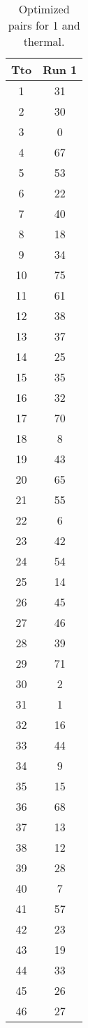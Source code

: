 \begin{table}
  \centering
  \scriptsize
  \caption{Optimized pairs for 1 and thermal.}
  \label{tab_pairs}
\begin{tabular}{c c }
\hline
Tto & Run 1 \\
\hline
1 & 31 \\
2 & 30 \\
3 & 0 \\
4 & 67 \\
5 & 53 \\
6 & 22 \\
7 & 40 \\
8 & 18 \\
9 & 34 \\
10 & 75 \\
11 & 61 \\
12 & 38 \\
13 & 37 \\
14 & 25 \\
15 & 35 \\
16 & 32 \\
17 & 70 \\
18 & 8 \\
19 & 43 \\
20 & 65 \\
21 & 55 \\
22 & 6 \\
23 & 42 \\
24 & 54 \\
25 & 14 \\
26 & 45 \\
27 & 46 \\
28 & 39 \\
29 & 71 \\
30 & 2 \\
31 & 1 \\
32 & 16 \\
33 & 44 \\
34 & 9 \\
35 & 15 \\
36 & 68 \\
37 & 13 \\
38 & 12 \\
39 & 28 \\
40 & 7 \\
41 & 57 \\
42 & 23 \\
43 & 19 \\
44 & 33 \\
45 & 26 \\
46 & 27 \\

\end{tabular}
\end{table}
